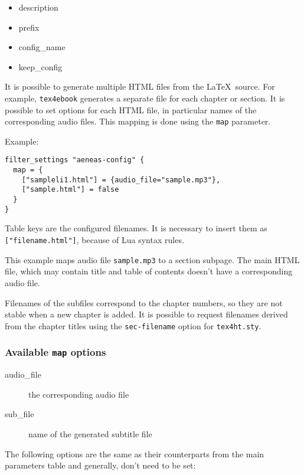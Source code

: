 \begin{itemize}
\tightlist
\item
  description
\item
  prefix
\item
  config\_name
\item
  keep\_config
\end{itemize}

It is possible to generate multiple HTML files from the \LaTeX~source.
For example, \texttt{tex4ebook} generates a separate file for each
chapter or section. It is possible to set options for each HTML file, in
particular names of the corresponding audio files. This mapping is done
using the \texttt{map} parameter.

Example:

\begin{verbatim}
filter_settings "aeneas-config" {
  map = {
    ["sampleli1.html"] = {audio_file="sample.mp3"}, 
    ["sample.html"] = false
  }
}
\end{verbatim}

Table keys are the configured filenames. It is necessary to insert them
as \texttt{{[}"filename.html"{]}}, because of Lua syntax rules.

This example maps audio file \texttt{sample.mp3} to a section subpage.
The main HTML file, which may contain title and table of contents
doesn't have a corresponding audio file.

Filenames of the subfiles correspond to the chapter numbers, so they are
not stable when a new chapter is added. It is possible to request
filenames derived from the chapter titles using the
\texttt{sec-filename} option for \texttt{tex4ht.sty}.

\hypertarget{available-map-options}{%
\subsubsection{\texorpdfstring{Available \texttt{map}
options}{Available map options}}\label{available-map-options}}

\begin{description}
\item[audio\_file]
the corresponding audio file
\item[sub\_file]
name of the generated subtitle file
\end{description}

The following options are the same as their counterparts from the main
parameters table and generally, don't need to be set:

